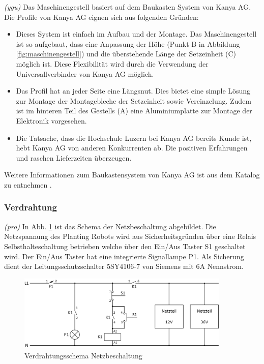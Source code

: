 \textit{(ygu)} Das Maschinengestell basiert auf dem Baukasten System von Kanya AG. Die Profile von Kanya AG eignen sich aus folgenden Gründen:
\begin{itemize}
	\item Dieses System ist einfach im Aufbau und der Montage. Das Maschinengestell ist so aufgebaut, dass eine Anpassung der Höhe (Punkt B in Abbildung \ref{fig:maschinengestell}) und die überstehende Länge der Setzeinheit (C) möglich ist. Diese Flexibilität wird durch die Verwendung der Universallverbinder von Kanya AG möglich.
	
	\item Das Profil hat an jeder Seite eine Längsnut. Dies bietet eine simple Lösung zur Montage der Montagebleche der Setzeinheit sowie Vereinzelung. Zudem ist im hinteren Teil des Gestells (A) eine Aluminiumplatte zur Montage der Elektronik vorgesehen.
	
	\item Die Tatsache, dass die Hochschule Luzern bei Kanya AG bereits Kunde ist, hebt Kanya AG von anderen Konkurrenten ab. Die positiven Erfahrungen und raschen Lieferzeiten überzeugen.
\end{itemize}
Weitere Informationen zum Baukastensystem von Kanya AG ist aus dem Katalog zu entnehmen \cite{kanya}.

\subsubsection{Verdrahtung}
\textit{(pro)} In Abb. \ref{fig:Verdrahtung} ist das Schema der Netzbeschaltung abgebildet. Die Netzspannung des Planting Robots wird aus Sicherheitsgründen über eine Relais Selbsthalteschaltung betrieben welche über den Ein/Aus Taster S1 geschaltet wird. Der Ein/Aus Taster hat eine integrierte Signallampe P1. Als Sicherung dient der Leitungsschutzschalter 5SY4106-7 von Siemens mit 6A Nennstrom.

\begin{figure}[H]
	\includegraphics[draft=false,width=0.9\textwidth]{Illustrationen/6-Umsetzung/Verdrahtungsschema.png}
	\caption{Verdrahtungsschema Netzbeschaltung}
	\label{fig:Verdrahtung}
\end{figure}

